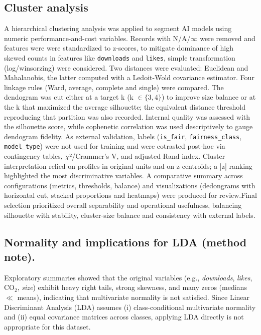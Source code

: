 \documentclass[journal]{IEEEtran}
\begin{document}
	\subsection{Cluster analysis}
	\label{methodology:cluanal}
	A hierarchical clustering analysis was applied to segment AI models using numeric performance-and-cost variables. Records with N/A/$\infty$ were removed and features were were standardized to z-scores, to mitigate dominance of high skewed counts in features like \texttt{downloads} and \texttt{likes}, simple transformation (log/winsorzing) were considered. Two distances were evaluated: Euclidean and Mahalanobis, the latter computed with a Ledoit-Wold covariance estimator. Four linkage rules (Ward, average, complete and single) were compared.
	The dendogram was cut either at a target k (k $\in{\{3,4\}}$) to improve size balance or at the k that maximized the average silhouette; the equivalent distance threshold reproducing that partition was also recorded. Internal quality was assessed with the silhouette score, while cophenetic correlation was used descriptively to gauge dendogram fidelity. As external validation, labels (\texttt{is\_fair}, \texttt{fairness\_class}, \texttt{model\_type}) were not used for training and were cotrasted post-hoc via contingency tables, $\chi$²/Crammer's V, and adjusted Rand index.
	Cluster interpretation relied on profiles in original units and on z-centroids; a |z| ranking highlighted the most discriminative variables. A comparative summary across configurations (metrics, thresholds, balance) and visualizations (dedongrams with horizontal cut, stacked proportions and heatmaps) were produced for review.Final selection prioritized overall separability and operational usefulness, balancing silhouette with stability, cluster-size balance and consistency with external labels. 

	\subsection{Normality and implications for LDA (method note).}
	Exploratory summaries showed that the original variables (e.g., \emph{downloads}, \emph{likes}, CO$_2$, \emph{size}) exhibit
	heavy right tails, strong skewness, and many zeros (medians $\ll$ means), indicating that multivariate normality is not
	satisfied. Since Linear Discriminant Analysis (LDA) assumes (i) class-conditional multivariate normality and (ii) equal
	covariance matrices across classes, applying LDA directly is not appropriate for this dataset.
	
\end{document}
